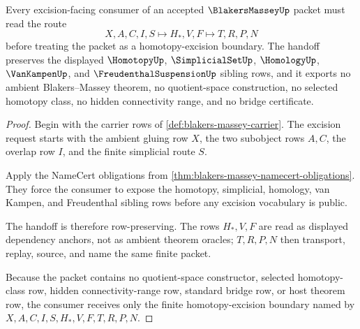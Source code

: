 \begin{theorem}
\label{thm:blakers-massey-excision-handoff}
Every excision-facing consumer of an accepted $\BlakersMasseyUp$ packet must read the route
$$
X,A,C,I,S \longmapsto H_*,V,F \longmapsto T,R,P,N
$$
before treating the packet as a homotopy-excision boundary. The handoff preserves the displayed $\HomotopyUp$, $\SimplicialSetUp$, $\HomologyUp$, $\VanKampenUp$, and $\FreudenthalSuspensionUp$ sibling rows, and it exports no ambient Blakers--Massey theorem, no quotient-space construction, no selected homotopy class, no hidden connectivity range, and no bridge certificate.
\end{theorem}
\begin{proof}
Begin with the carrier rows of \autoref{def:blakers-massey-carrier}. The excision request starts with the ambient gluing row $X$, the two subobject rows $A,C$, the overlap row $I$, and the finite simplicial route $S$.

Apply the NameCert obligations from \autoref{thm:blakers-massey-namecert-obligations}. They force the consumer to expose the homotopy, simplicial, homology, van Kampen, and Freudenthal sibling rows before any excision vocabulary is public.

The handoff is therefore row-preserving. The rows $H_*,V,F$ are read as displayed dependency anchors, not as ambient theorem oracles; $T,R,P,N$ then transport, replay, source, and name the same finite packet.

Because the packet contains no quotient-space constructor, selected homotopy-class row, hidden connectivity-range row, standard bridge row, or host theorem row, the consumer receives only the finite homotopy-excision boundary named by $X,A,C,I,S,H_*,V,F,T,R,P,N$.
\end{proof}



